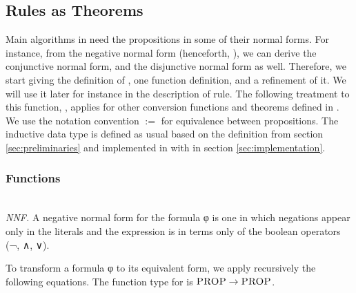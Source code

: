 \documentclass[../main.tex]{subfiles}
\begin{document}
\subsection{Rules as Theorems}

Main algorithms in \CPL need the propositions in some of their normal
forms. For instance, from the negative normal form
(henceforth, ), we can derive the conjunctive normal form,
and the disjunctive normal form as well.
Therefore, we start giving the definition of , one
function definition,  and a refinement of it.
We will use it later for instance in the description of \canonicalize
rule. The following treatment to this function, ,
applies for other conversion functions and theorems defined in
\cite{AgdaProp,AgdaMetis}.
We use the notation convention $:=$ for equivalence between
propositions. The \PROP inductive data type is defined as usual
based on the definition from section \ref{sec:preliminaries} and
implemented in \Agda with  in section
\ref{sec:implementation}.

\subsubsection{\CPL Functions}
\hspace*{5cm}\\[3mm]
\emph{NNF.}
A negative normal form for the formula φ is one in which negations
appear only in the literals and the expression is in terms only of
the boolean operators (¬, ∧, ∨).

To transform a formula φ to its equivalent  form, we
apply recursively the following equations. The function type for
 is $\textsc{PROP} \to \textsc{PROP}$.
\end{document}
